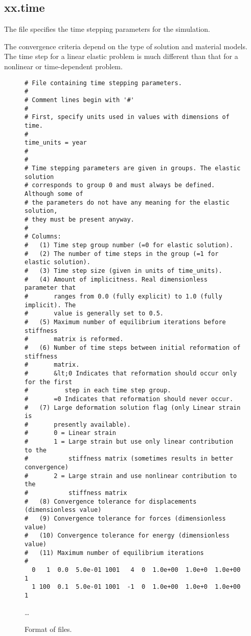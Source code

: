 \subsection{xx.time}

The  file specifies the time stepping parameters for
the simulation.

\begin{warning}
  The convergence criteria depend on the type of solution and material
  models. The time step for a linear elastic problem is much different
  than that for a nonlinear or time-dependent problem.
\end{warning}

\begin{figure}
  \begin{center}
\begin{verbatim}
# File containing time stepping parameters.
#
# Comment lines begin with '#'
#
# First, specify units used in values with dimensions of time.
#
time_units = year
#
#
# Time stepping parameters are given in groups. The elastic solution
# corresponds to group 0 and must always be defined. Although some of
# the parameters do not have any meaning for the elastic solution,
# they must be present anyway.
#
# Columns:
#   (1) Time step group number (=0 for elastic solution).
#   (2) The number of time steps in the group (=1 for elastic solution).
#   (3) Time step size (given in units of time_units).
#   (4) Amount of implicitness. Real dimensionless parameter that
#       ranges from 0.0 (fully explicit) to 1.0 (fully implicit). The
#       value is generally set to 0.5.
#   (5) Maximum number of equilibrium iterations before stiffness
#       matrix is reformed.
#   (6) Number of time steps between initial reformation of stiffness
#       matrix.
#       &lt;0 Indicates that reformation should occur only for the first
#          step in each time step group.
#       =0 Indicates that reformation should never occur.
#   (7) Large deformation solution flag (only Linear strain is
#       presently available).
#       0 = Linear strain 
#       1 = Large strain but use only linear contribution to the
#           stiffness matrix (sometimes results in better convergence)
#       2 = Large strain and use nonlinear contribution to the
#           stiffness matrix
#   (8) Convergence tolerance for displacements (dimensionless value)
#   (9) Convergence tolerance for forces (dimensionless value)
#   (10) Convergence tolerance for energy (dimensionless value)
#   (11) Maximum number of equilibrium iterations
#
  0   1  0.0  5.0e-01 1001   4  0  1.0e+00  1.0e+0  1.0e+00 1
  1 100  0.1  5.0e-01 1001  -1  0  1.0e+00  1.0e+0  1.0e+00 1
\end{verbatim}
    \ldots
    \caption{Format of  files.}
  \end{center}
\end{figure}
